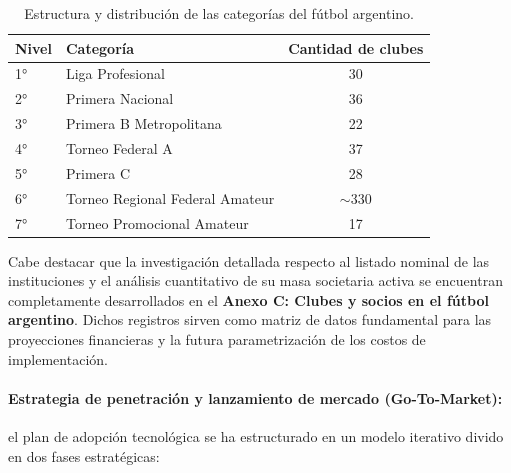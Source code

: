 \begin{table}[h!]
\centering
\renewcommand{\arraystretch}{1.3}
\begin{tabular}{|l|l|c|}
\hline
\rowcolor{gray!20} \textbf{Nivel} & \textbf{Categoría} & \textbf{Cantidad de clubes} \\ \hline
1° & Liga Profesional & 30 \\ \hline
2° & Primera Nacional & 36 \\ \hline
3° & Primera B Metropolitana & 22 \\ \hline
4° & Torneo Federal A & 37 \\ \hline
5° & Primera C & 28 \\ \hline
6° & Torneo Regional Federal Amateur & $\sim$330 \\ \hline
7° & Torneo Promocional Amateur & 17 \\ \hline

\end{tabular}
\caption{Estructura y distribución de las categorías del fútbol argentino.}
\label{tab:categorias_futbol}
\end{table}

Cabe destacar que la investigación detallada respecto al listado nominal de las instituciones y el análisis cuantitativo de su masa societaria activa se encuentran completamente desarrollados en el \textbf{Anexo C: Clubes y socios en el fútbol argentino}. Dichos registros sirven como matriz de datos fundamental para las proyecciones financieras y la futura parametrización de los costos de implementación.

\paragraph{Estrategia de penetración y lanzamiento de mercado (Go-To-Market):}

el plan de adopción tecnológica se ha estructurado en un modelo iterativo divido en dos fases estratégicas:

